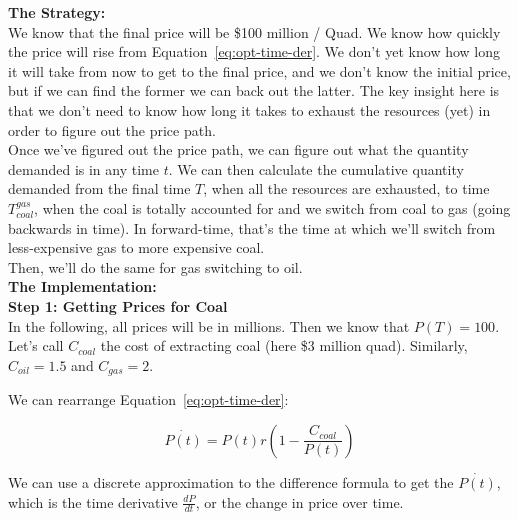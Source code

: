 \begin{enumerate}
\begin{Exercise}
\begin{sol}
        \textbf{The Strategy:}\\
        
        We know that the final price will be \$100 million / Quad. We know how quickly the price will rise from Equation~\eqref{eq:opt-time-der}. We don't yet know how long it will take from now to get to the final price, and we don't know the initial price, but if we can find the former we can back out the latter. The key insight here is that we don't need to know how long it takes to exhaust the resources (yet) in order to figure out the price path.\\
        
        Once we've figured out the price path, we can figure out what the quantity demanded is in any time $t$. We can then calculate the cumulative quantity demanded from the final time $T$, when all the resources are exhausted, to time $T_{coal}^{gas}$, when the coal is totally accounted for and we switch from coal to gas (going backwards in time). In forward-time, that's the time at which we'll switch from less-expensive gas to more expensive coal.\\
        
        Then, we'll do the same for gas switching to oil.\\
        
        \textbf{The Implementation:}\\
        
                \noindent 
                \textbf{Step 1: Getting Prices for Coal}\\

        In the following, all prices will be in millions. Then we know that $P(T)=100$. Let's call $C_{coal}$ the cost of extracting coal (here \$3 million quad). Similarly, $C_{oil} = 1.5$ and $C_{gas} = 2.$
        
        We can rearrange Equation~\eqref{eq:opt-time-der}:
        
        \begin{equation*}
            \dot{P(t)}=P(t)r\left(1-\frac{C_{coal}}{P(t)}\right)
        \end{equation*}
        
      

               
        We can use a discrete approximation to the difference formula to get the $\dot{P(t)}$, which is the time derivative $\frac{dP}{dt}$, or the change in price over time.\\
        

\end{sol}
\end{Exercise}
\end{enumerate}
